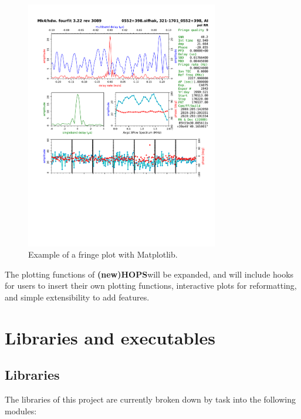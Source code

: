 \documentclass[hidelinks]{article}
\let\Oldsection\section
\renewcommand{\section}{\FloatBarrier\Oldsection}
\let\Oldsubsection\subsection
\renewcommand{\subsection}{\FloatBarrier\Oldsubsection}
\newcommand{\nuHOPS}{{\bf {\color{dkgreen} (new)HOPS}}}
\begin{document}
\begin{figure}[h!]
\begin{center}
  \includegraphics[width=0.75\textwidth]{matplotlib-fringe-plot.pdf}
    \caption{Example of a fringe plot with Matplotlib.}
    \label{fig:matplotlib-fringe-plot}
\end{center}
\end{figure}


The plotting functions of \nuHOPS will be expanded, and will include hooks for users to insert their own plotting functions, interactive plots for reformatting, and simple extensibility to add features.



\section{Libraries and executables}

\subsection{Libraries}

The libraries of this project are currently broken down by task into the following modules:
\end{document}
